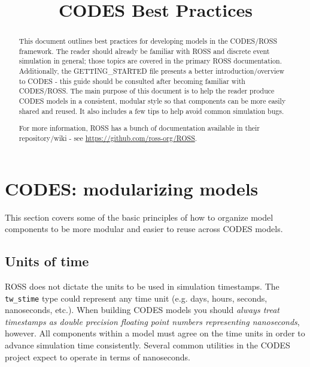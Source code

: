\documentclass[conference,10pt,compsocconf,onecolumn]{IEEEtran}
\begin{document}
\title{CODES Best Practices}





\renewcommand{\thetable}{\arabic{table}}

\maketitle

\begin{abstract}
This document outlines best practices for developing models in the
CODES/ROSS framework.  The reader should already be familiar with ROSS
and discrete event simulation in general; those topics are covered in the primary
ROSS documentation. Additionally, the GETTING\_STARTED file presents a better
introduction/overview to CODES - this guide should be consulted after becoming
familiar with CODES/ROSS.
%
The main purpose of this document is to help the reader produce
CODES models in a consistent, modular style so that components can be more
easily shared and reused.  It also includes a few tips to help avoid common
simulation bugs.

For more information, ROSS has a bunch of documentation available in their
repository/wiki - see \url{https://github.com/ross-org/ROSS}.
\end{abstract}

\section{CODES: modularizing models}

This section covers some of the basic principles of how to organize model
components to be more modular and easier to reuse across CODES models.

\subsection{Units of time}

ROSS does not dictate the units to be used in simulation timestamps.
The \texttt{tw\_stime} type could represent any time unit
(e.g. days, hours, seconds, nanoseconds, etc.).  When building CODES
models you should \emph{always treat timestamps as double precision floating
point numbers representing nanoseconds}, however.
All components within a model must agree on the time units in order to
advance simulation time consistently.  Several common utilities in the
CODES project expect to operate in terms of nanoseconds.
\end{document}

